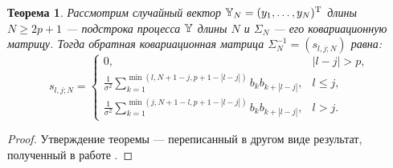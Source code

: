 \documentclass[12pt,a4paper]{article}
\newtheorem{theorem}{Теорема}
\begin{document}
\begin{theorem}\label{th:invcov}
	Рассмотрим случайный вектор $\mathbb{Y}_N = (y_1, \ldots, y_N)^{\mathrm{T}}$ длины $N \ge 2p + 1$ --- подстрока процесса $\mathbb{Y}$ длины $N$ и $\Sigma_N$ --- его ковариационную матрицу. Тогда обратная ковариационная матрица $\Sigma_N^{-1} = (s_{l, j; N})$ равна:
	\begin{equation*}
	s_{l, j; N} = \begin{cases}
	0, & |l - j| > p, \\
	\frac{1}{\sigma^2}\sum_{k = 1}^{\min(l, N + 1 - j, p + 1 - |l - j|)}b_k b_{k + |l - j|}, & l \le j, \\
	\frac{1}{\sigma^2}\sum_{k = 1}^{\min(j, N + 1 - l, p + 1 - |l - j|)}b_k b_{k + |l - j|}, & l > j.
	\end{cases}
	\end{equation*}
\end{theorem}
\begin{proof}
	Утверждение теоремы --- переписанный в другом виде результат, полученный в работе \cite{Verbyla1985}.
\end{proof}
\end{document}
